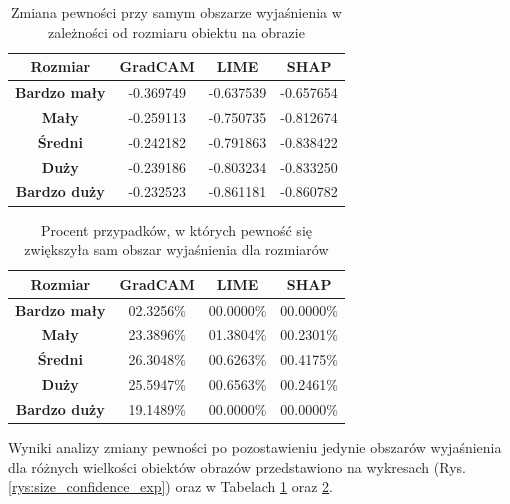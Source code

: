 \begin{table}[h]
	\centering
	\begin{tabular}{|c|c|c|c|}
		\hline
		\textbf{Rozmiar}     & \textbf{GradCAM} & \textbf{LIME} & \textbf{SHAP} \\
		\hline
		\textbf{Bardzo mały} & -0.369749        & -0.637539     & -0.657654     \\
		\hline
		\textbf{Mały}        & -0.259113        & -0.750735     & -0.812674     \\
		\hline
		\textbf{Średni}      & -0.242182        & -0.791863     & -0.838422     \\
		\hline
		\textbf{Duży}        & -0.239186        & -0.803234     & -0.833250     \\
		\hline
		\textbf{Bardzo duży} & -0.232523        & -0.861181     & -0.860782     \\
		\hline
	\end{tabular}
	\caption{Zmiana pewności przy samym obszarze wyjaśnienia w zależności od rozmiaru obiektu na obrazie}
	\label{tab:size_confidence_exp}
\end{table}

\begin{table}[h]
	\centering
	\begin{tabular}{|c|c|c|c|}
		\hline
		\textbf{Rozmiar}     & \textbf{GradCAM} & \textbf{LIME} & \textbf{SHAP} \\
		\hline
		\textbf{Bardzo mały} & 02.3256\%        & 00.0000\%     & 00.0000\%     \\
		\hline
		\textbf{Mały}        & 23.3896\%        & 01.3804\%     & 00.2301\%     \\
		\hline
		\textbf{Średni}      & 26.3048\%        & 00.6263\%     & 00.4175\%     \\
		\hline
		\textbf{Duży}        & 25.5947\%        & 00.6563\%     & 00.2461\%     \\
		\hline
		\textbf{Bardzo duży} & 19.1489\%        & 00.0000\%     & 00.0000\%     \\
		\hline
	\end{tabular}
	\caption{Procent przypadków, w których pewność się zwiększyła sam obszar wyjaśnienia dla rozmiarów}
	\label{tab:size_confidence_exp_percent}
\end{table}

Wyniki analizy zmiany pewności po pozostawieniu jedynie obszarów wyjaśnienia dla różnych wielkości obiektów obrazów przedstawiono na wykresach (Rys. \ref{rys:size_confidence_exp}) oraz w Tabelach \ref{tab:size_confidence_exp} oraz \ref{tab:size_confidence_exp_percent}.

